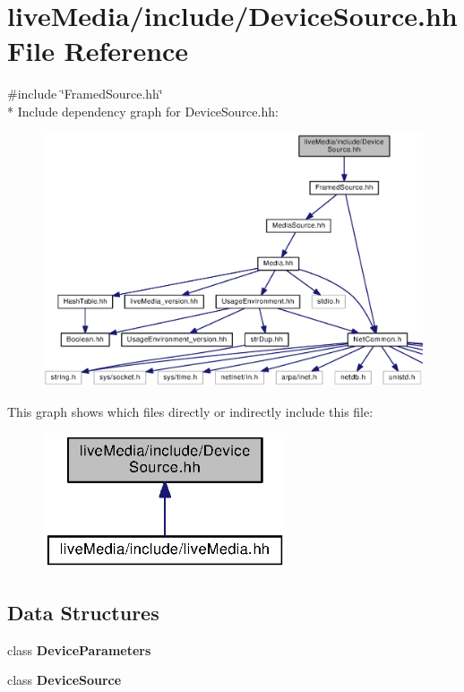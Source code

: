 \section{live\+Media/include/\+Device\+Source.hh File Reference}
\label{DeviceSource_8hh}
{\ttfamily \#include \char`\"{}Framed\+Source.\+hh\char`\"{}}\\*
Include dependency graph for Device\+Source.\+hh\+:
\nopagebreak
\begin{figure}[H]
\begin{center}
\leavevmode
\includegraphics[width=350pt]{DeviceSource_8hh__incl}
\end{center}
\end{figure}
This graph shows which files directly or indirectly include this file\+:
\nopagebreak
\begin{figure}[H]
\begin{center}
\leavevmode
\includegraphics[width=204pt]{DeviceSource_8hh__dep__incl}
\end{center}
\end{figure}
\subsection*{Data Structures}
\begin{DoxyCompactItemize}
\item 
class {\bf Device\+Parameters}
\item 
class {\bf Device\+Source}
\end{DoxyCompactItemize}
